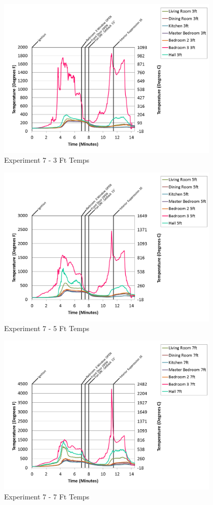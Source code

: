 \documentclass{article}
\begin{document}
\begin{appendices}
\begin{figure}[h!]
	\centering
	\includegraphics[height=3.05in]{0_Images/Results_Charts/Exp_7_Charts/3FtTemps.png}
	\caption{Experiment 7 - 3 Ft Temps}
\end{figure}

\clearpage

\begin{figure}[h!]
	\centering
	\includegraphics[height=3.05in]{0_Images/Results_Charts/Exp_7_Charts/5FtTemps.png}
	\caption{Experiment 7 - 5 Ft Temps}
\end{figure}


\begin{figure}[h!]
	\centering
	\includegraphics[height=3.05in]{0_Images/Results_Charts/Exp_7_Charts/7FtTemps.png}
	\caption{Experiment 7 - 7 Ft Temps}
\end{figure}


\end{appendices}
\end{document}
